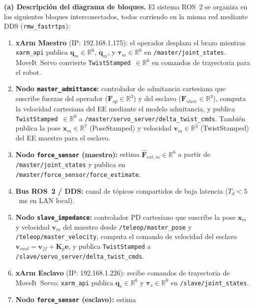 \documentclass[journal,10pt,twoside]{IEEEtran}
\begin{document}
\textbf{(a) Descripción del diagrama de bloques.}
El sistema ROS~2 se organiza en los siguientes bloques interconectados,
todos corriendo en la misma red mediante DDS (\texttt{rmw\_fastrtps}):
\begin{enumerate}[label=\roman*.]
  \item \textbf{xArm Maestro} (IP: 192.168.1.175): el operador
        desplaza el brazo mientras \texttt{xarm\_api} publica
        $\bm{q}_m \in \mathbb{R}^6$, $\dot{\bm{q}}_m$, y
        $\bm{\tau}_m \in \mathbb{R}^6$ en \texttt{/master/joint\_states}.
        MoveIt~Servo convierte \texttt{TwistStamped}~$\in \mathbb{R}^6$
        en comandos de trayectoria para el robot.
  \item \textbf{Nodo \texttt{master\_admittance}:} controlador de
        admitancia cartesiana que suscribe fuerzas del operador
        ($\bm{F}_{op} \in \mathbb{R}^3$) y del esclavo
        ($\bm{F}_{slave} \in \mathbb{R}^3$), computa la velocidad
        cartesiana del EE mediante el modelo admitancia, y publica
        \texttt{TwistStamped}~$\in \mathbb{R}^6$ a
        \texttt{/master/servo\_server/delta\_twist\_cmds}.
        También publica la pose $\bm{x}_m \in \mathbb{R}^7$ (PoseStamped)
        y velocidad $\bm{v}_m \in \mathbb{R}^3$ (TwistStamped) del EE
        maestro para el esclavo.
  \item \textbf{Nodo \texttt{force\_sensor} (maestro):} estima
        $\hat{\bm{F}}_{ext,m} \in \mathbb{R}^6$ a partir de
        \texttt{/master/joint\_states} y publica en
        \texttt{/master/force\_sensor/force\_estimate}.
  \item \textbf{Bus ROS~2 / DDS:} canal de tópicos compartidos de
        baja latencia ($T_d < 5$~ms en LAN local).
  \item \textbf{Nodo \texttt{slave\_impedance}:} controlador PD
        cartesiano que suscribe la pose $\bm{x}_m$ y velocidad
        $\bm{v}_m$ del maestro desde \texttt{/teleop/master\_pose} y
        \texttt{/teleop/master\_velocity}, computa el comando de
        velocidad del esclavo $\bm{v}_{cmd} = \bm{v}_{ff} +
        \bm{K}_p\bm{e}$, y publica \texttt{TwistStamped} a
        \texttt{/slave/servo\_server/delta\_twist\_cmds}.
  \item \textbf{xArm Esclavo} (IP: 192.168.1.226): recibe comandos
        de trayectoria de MoveIt~Servo; \texttt{xarm\_api} publica
        $\bm{q}_s \in \mathbb{R}^6$ y $\bm{\tau}_s \in \mathbb{R}^6$
        en \texttt{/slave/joint\_states}.
  \item \textbf{Nodo \texttt{force\_sensor} (esclavo):} estima

\end{enumerate}
\end{document}
